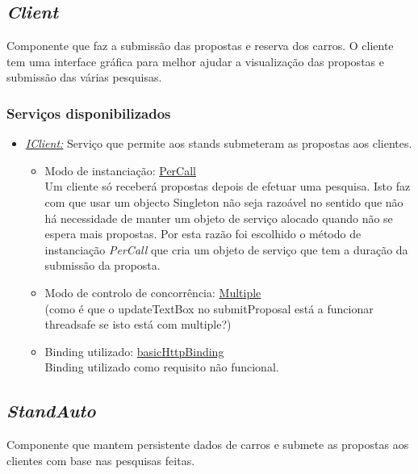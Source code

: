\documentclass[a4paper]{article}
\begin{document}
\subsection{\emph{Client}}
Componente que faz a submissão das propostas e reserva dos carros. O cliente tem uma interface gráfica para melhor ajudar a visualização das propostas e submissão das várias pesquisas.
\subsubsection{Serviços disponibilizados}
\begin{itemize} 

\item
\emph{\underline{IClient:}}
Serviço que permite aos stands submeteram as propostas aos clientes.
	\begin{itemize}
		\item
		Modo de instanciação: \underline{PerCall}\\
		Um cliente só receberá propostas depois de efetuar uma pesquisa. Isto faz com que usar um objecto Singleton não seja razoável no sentido que não há necessidade de manter um objeto de serviço alocado quando não se espera mais propostas. Por esta razão foi escolhido o método de instanciação \emph{PerCall} que cria um objeto de serviço que tem a duração da submissão da proposta.
		\item
		Modo de controlo de concorrência: \underline{Multiple}\\
		(como é que o updateTextBox no submitProposal está a funcionar threadsafe se isto está com multiple?)
		
		\item
		Binding utilizado: \underline{basicHttpBinding}\\
		Binding utilizado como requisito não funcional.
	\end{itemize}
\end{itemize}


\subsection{\emph{StandAuto}}
Componente que mantem persistente dados de carros e submete as propostas aos clientes com base nas pesquisas feitas.
\end{document}
